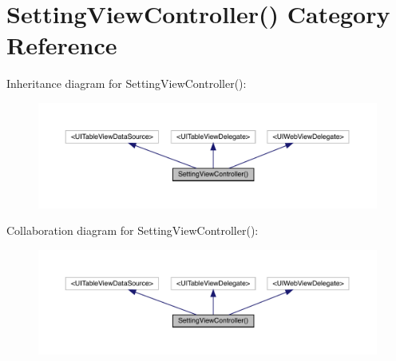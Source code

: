 \hypertarget{category_setting_view_controller_07_08}{}\section{Setting\+View\+Controller() Category Reference}
\label{category_setting_view_controller_07_08}


Inheritance diagram for Setting\+View\+Controller()\+:\nopagebreak
\begin{figure}[H]
\begin{center}
\leavevmode
\includegraphics[width=350pt]{category_setting_view_controller_07_08__inherit__graph}
\end{center}
\end{figure}


Collaboration diagram for Setting\+View\+Controller()\+:\nopagebreak
\begin{figure}[H]
\begin{center}
\leavevmode
\includegraphics[width=350pt]{category_setting_view_controller_07_08__coll__graph}
\end{center}
\end{figure}
